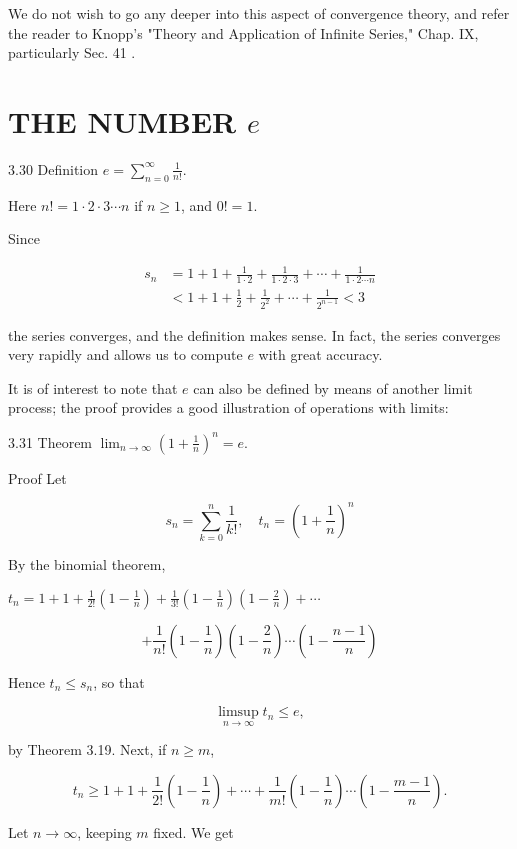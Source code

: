 \documentclass[10pt]{article}
\begin{document}
We do not wish to go any deeper into this aspect of convergence theory, and refer the reader to Knopp's "Theory and Application of Infinite Series," Chap. IX, particularly Sec. 41 .

\section{THE NUMBER $e$}
3.30 Definition $e=\sum_{n=0}^{\infty} \frac{1}{n !}$.

Here $n !=1 \cdot 2 \cdot 3 \cdots n$ if $n \geq 1$, and $0 !=1$.

Since

$$
\begin{aligned}
s_{n} & =1+1+\frac{1}{1 \cdot 2}+\frac{1}{1 \cdot 2 \cdot 3}+\cdots+\frac{1}{1 \cdot 2 \cdots n} \\
& <1+1+\frac{1}{2}+\frac{1}{2^{2}}+\cdots+\frac{1}{2^{n-1}}<3
\end{aligned}
$$

the series converges, and the definition makes sense. In fact, the series converges very rapidly and allows us to compute $e$ with great accuracy.

It is of interest to note that $e$ can also be defined by means of another limit process; the proof provides a good illustration of operations with limits:

3.31 Theorem $\lim _{n \rightarrow \infty}\left(1+\frac{1}{n}\right)^{n}=e$.

Proof Let

$$
s_{n}=\sum_{k=0}^{n} \frac{1}{k !}, \quad t_{n}=\left(1+\frac{1}{n}\right)^{n}
$$

By the binomial theorem,

$t_{n}=1+1+\frac{1}{2 !}\left(1-\frac{1}{n}\right)+\frac{1}{3 !}\left(1-\frac{1}{n}\right)\left(1-\frac{2}{n}\right)+\cdots$

$$
+\frac{1}{n !}\left(1-\frac{1}{n}\right)\left(1-\frac{2}{n}\right) \cdots\left(1-\frac{n-1}{n}\right)
$$

Hence $t_{n} \leq s_{n}$, so that

$$
\limsup _{n \rightarrow \infty} t_{n} \leq e,
$$

by Theorem 3.19. Next, if $n \geq m$,

$$
t_{n} \geq 1+1+\frac{1}{2 !}\left(1-\frac{1}{n}\right)+\cdots+\frac{1}{m !}\left(1-\frac{1}{n}\right) \cdots\left(1-\frac{m-1}{n}\right) .
$$

Let $n \rightarrow \infty$, keeping $m$ fixed. We get
\end{document}
